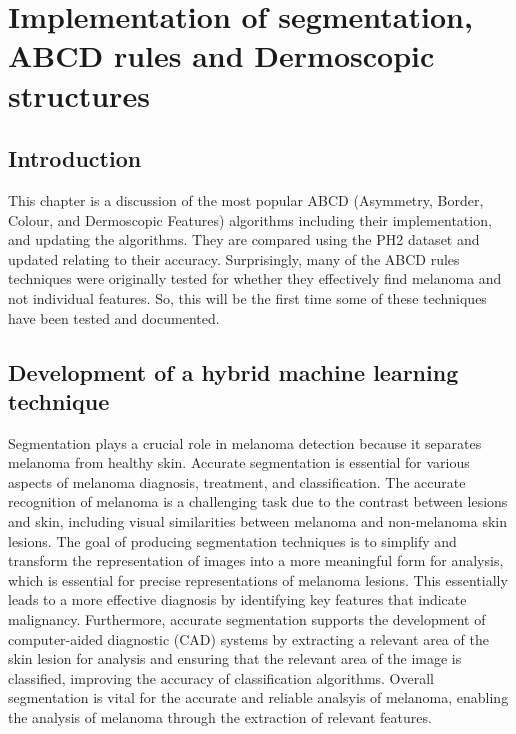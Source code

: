 
\chapter{Implementation of segmentation, ABCD rules  and Dermoscopic structures}

\section{Introduction}
This chapter is a discussion of the most popular ABCD (Asymmetry, Border, Colour, and Dermoscopic Features) algorithms including their implementation, and updating the algorithms. They are compared using the PH2 dataset and updated relating to their accuracy. Surprisingly, many of the ABCD rules techniques were originally tested for whether they effectively find melanoma and not individual features. So, this will be the first time some of these techniques have been tested and documented.

\section{Development of a hybrid machine learning technique}
Segmentation plays a crucial role in melanoma detection because it separates melanoma from healthy skin. Accurate segmentation is essential for various aspects of melanoma diagnosis, treatment, and classification\cite{Albahli2020}. The accurate recognition of melanoma is a challenging task due to the contrast between lesions and skin, including visual similarities between melanoma and non-melanoma skin lesions\cite{li2018}. The goal of producing segmentation techniques is to simplify and transform the representation of images into a more meaningful form for analysis, which is essential for precise representations of melanoma lesions\cite{Masood2013}. This essentially leads to a more effective diagnosis by identifying key features that indicate malignancy\cite{ali2023}. Furthermore, accurate segmentation supports the development of computer-aided diagnostic (CAD) systems by extracting a relevant area of the skin lesion for analysis and ensuring that the relevant area of the image is classified, improving the accuracy of classification algorithms\cite{bi2019}. Overall segmentation is vital for the accurate and reliable analsyis of melanoma, enabling the analysis of melanoma through the extraction of relevant features.

